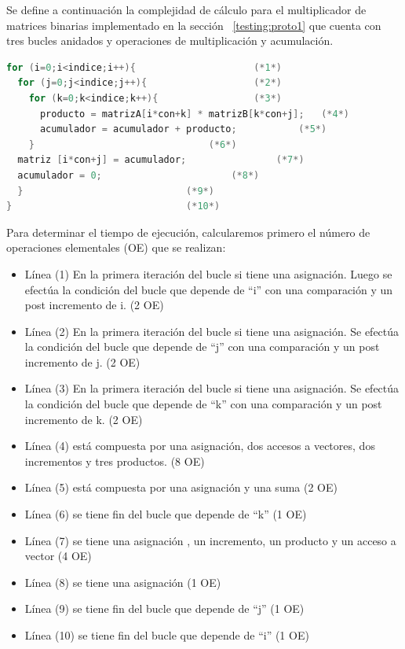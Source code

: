 		Se define a continuación la complejidad de cálculo para el multiplicador de matrices binarias implementado en la sección ~\ref {testing:proto1} que
		cuenta con tres bucles anidados y operaciones de multiplicación y acumulación.
	
\newpage			
	\begin{lstlisting}[language=C,frame=single , caption={Código del programa de prueba multiplicador de matrices binarias}]
for (i=0;i<indice;i++){						(*1*)
  for (j=0;j<indice;j++){					(*2*)
    for (k=0;k<indice;k++){					(*3*)
	  producto = matrizA[i*con+k] * matrizB[k*con+j];	(*4*)
	  acumulador = acumulador + producto;			(*5*) 
    }								(*6*)
  matriz [i*con+j] = acumulador;				(*7*)
  acumulador = 0;						(*8*)
  }								(*9*)
}								(*10*)
	\end{lstlisting}
		
	    Para determinar el tiempo de ejecución, calcularemos primero el número de operaciones elementales (OE) que se realizan: 
 		\begin{itemize}
 		  \item Línea (1) En la primera iteración del bucle si tiene una asignación. Luego se efectúa la condición del bucle que depende de ``i'' con
 		  una comparación y un post incremento de i. (2 OE)
 		  \item Línea (2) En la primera iteración del bucle si tiene una asignación. Se efectúa la condición del bucle que depende de ``j'' con una
 		  comparación y un post incremento de j. (2 OE)
 		  \item Línea (3) En la primera iteración del bucle si tiene una asignación. Se efectúa la condición del bucle que depende de ``k'' con una
 		  comparación y un post incremento de k. (2 OE)
 		  \item Línea (4) está compuesta por una asignación, dos accesos a vectores, dos incrementos y tres productos. (8 OE) 
 		  \item Línea (5) está compuesta por una asignación y una suma (2 OE)
 		  \item Línea (6) se tiene fin del bucle que depende de ``k'' (1 OE)
 		  \item Línea (7) se tiene una asignación , un incremento, un producto y un acceso a vector (4 OE)
 		  \item Línea (8) se tiene una asignación (1 OE)
 		  \item Línea (9) se tiene fin del bucle que depende de ``j'' (1 OE)
 		  \item Línea (10) se tiene fin del bucle que depende de ``i'' (1 OE)
 		\end{itemize}
		
